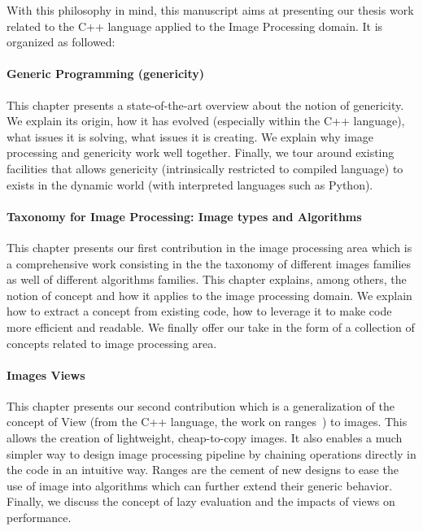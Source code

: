 With this philosophy in mind, this manuscript aims at presenting our thesis work related to the C++ language applied to
the Image Processing domain. It is organized as followed:

\paragraph{Generic Programming (genericity)} This chapter presents a state-of-the-art overview about the notion of
genericity. We explain its origin, how it has evolved (especially within the C++ language), what issues it is solving,
what issues it is creating. We explain why image processing and genericity work well together. Finally, we tour around
existing facilities that allows genericity (intrinsically restricted to compiled language) to exists in the dynamic
world (with interpreted languages such as Python).

\paragraph{Taxonomy for Image Processing: Image types and Algorithms} This chapter presents our first contribution in
the image processing area which is a comprehensive work consisting in the the taxonomy of different images families as
well of different algorithms families. This chapter explains, among others, the notion of concept and how it applies to
the image processing domain. We explain how to extract a concept from existing code, how to leverage it to make code
more efficient and readable. We finally offer our take in the form of a collection of concepts related to image
processing area.

\paragraph{Images Views} This chapter presents our second contribution which is a generalization of the concept of View
(from the C++ language, the work on ranges~\parencite{niebler.2018.ranges}) to images. This allows the creation of
lightweight, cheap-to-copy images. It also enables a much simpler way to design image processing pipeline by chaining
operations directly in the code in an intuitive way. Ranges are the cement of new designs to ease the use of image into
algorithms which can further extend their generic behavior. Finally, we discuss the concept of lazy evaluation and the
impacts of views on performance.

